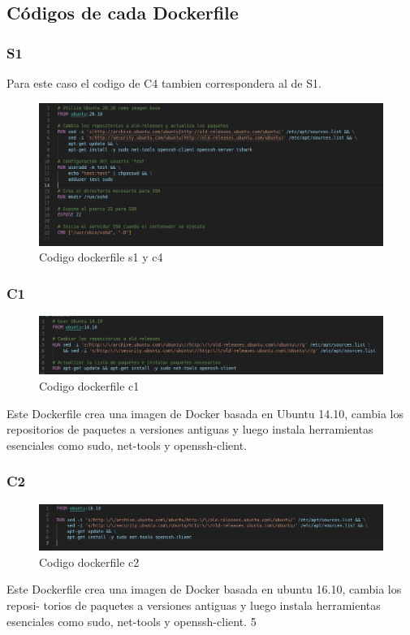 \documentclass[letter,12pt]{article}
\begin{document}
\subsection{Códigos de cada Dockerfile}
\subsubsection{S1}
Para este caso el codigo de C4 tambien correspondera al de S1.
    \begin{figure}[H]
        \centering
        \includegraphics[width=1\textwidth]{img/s1_c4.png}
        \caption{Codigo dockerfile s1 y c4}
    \end{figure}
\subsubsection{C1}
    \begin{figure}[H]
        \centering
        \includegraphics[width=1\textwidth]{img/c1_codigo.png}
        \caption{Codigo dockerfile c1}
    \end{figure}
Este Dockerfile crea una imagen de Docker basada en Ubuntu 14.10, cambia los repositorios de paquetes a versiones antiguas y luego instala herramientas esenciales como sudo, net-tools y openssh-client.

\subsubsection{C2}
    \begin{figure}[H]
        \centering
        \includegraphics[width=1\textwidth]{img/c2.png}
        \caption{Codigo dockerfile c2}
    \end{figure}
Este Dockerfile crea una imagen de Docker basada en ubuntu 16.10, cambia los reposi-
torios de paquetes a versiones antiguas y luego instala herramientas esenciales como sudo,
net-tools y openssh-client.
5
\end{document}
